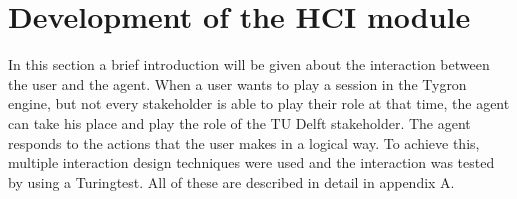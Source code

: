 \chapter{Development of the HCI module}
In this section a brief introduction will be given about the interaction between the user and the agent. When a user wants to play a session in the Tygron engine, but not every stakeholder is able to play their role at that time, the agent can take his place and play the role of the TU Delft stakeholder. The agent responds to the actions that the user makes in a logical way. To achieve this, multiple interaction design techniques were used and the interaction was tested by using a Turingtest. All of these are described in detail in appendix A. 